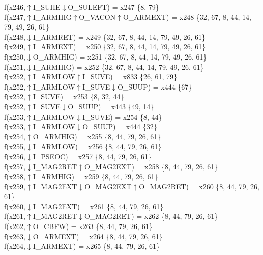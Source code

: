 f(x246,$\uparrow$I\_SUHE$\downarrow$O\_SULEFT) = x247 \{8, 79\} \\  
f(x247,$\uparrow$I\_ARMHIG$\uparrow$O\_VACON$\uparrow$O\_ARMEXT) = x248 \{32, 67, 8, 44, 14, 79, 49, 26, 61\} \\  
f(x248,$\downarrow$I\_ARMRET) = x249 \{32, 67, 8, 44, 14, 79, 49, 26, 61\} \\  
f(x249,$\uparrow$I\_ARMEXT) = x250 \{32, 67, 8, 44, 14, 79, 49, 26, 61\} \\  
f(x250,$\downarrow$O\_ARMHIG) = x251 \{32, 67, 8, 44, 14, 79, 49, 26, 61\} \\  
f(x251,$\downarrow$I\_ARMHIG) = x252 \{32, 67, 8, 44, 14, 79, 49, 26, 61\} \\  
f(x252,$\uparrow$I\_ARMLOW$\uparrow$I\_SUVE) = x833 \{26, 61, 79\} \\  
f(x252,$\uparrow$I\_ARMLOW$\uparrow$I\_SUVE$\downarrow$O\_SUUP) = x444 \{67\} \\  
f(x252,$\uparrow$I\_SUVE) = x253 \{8, 32, 44\} \\  
f(x252,$\uparrow$I\_SUVE$\downarrow$O\_SUUP) = x443 \{49, 14\} \\  
f(x253,$\uparrow$I\_ARMLOW$\downarrow$I\_SUVE) = x254 \{8, 44\} \\  
f(x253,$\uparrow$I\_ARMLOW$\downarrow$O\_SUUP) = x444 \{32\} \\  
f(x254,$\uparrow$O\_ARMHIG) = x255 \{8, 44, 79, 26, 61\} \\  
f(x255,$\downarrow$I\_ARMLOW) = x256 \{8, 44, 79, 26, 61\} \\  
f(x256,$\downarrow$I\_PSEOC) = x257 \{8, 44, 79, 26, 61\} \\  
f(x257,$\downarrow$I\_MAG2RET$\uparrow$O\_MAG2EXT) = x258 \{8, 44, 79, 26, 61\} \\  
f(x258,$\uparrow$I\_ARMHIG) = x259 \{8, 44, 79, 26, 61\} \\  
f(x259,$\uparrow$I\_MAG2EXT$\downarrow$O\_MAG2EXT$\uparrow$O\_MAG2RET) = x260 \{8, 44, 79, 26, 61\} \\  
f(x260,$\downarrow$I\_MAG2EXT) = x261 \{8, 44, 79, 26, 61\} \\  
f(x261,$\uparrow$I\_MAG2RET$\downarrow$O\_MAG2RET) = x262 \{8, 44, 79, 26, 61\} \\  
f(x262,$\uparrow$O\_CBFW) = x263 \{8, 44, 79, 26, 61\} \\  
f(x263,$\downarrow$O\_ARMEXT) = x264 \{8, 44, 79, 26, 61\} \\  
f(x264,$\downarrow$I\_ARMEXT) = x265 \{8, 44, 79, 26, 61\} \\  
